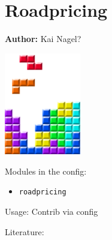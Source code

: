 \chapter{Roadpricing }
\label{ch:roadpricing}

\hfill \textbf{Author:} Kai Nagel?

\begin{center} \includegraphics[width=0.25\textwidth, angle=0]{figures/MATSimBook.png} \end{center}

Modules in the config: 
\begin{itemize}
	\item \lstinline|roadpricing|
\end{itemize}

Usage: Contrib via config

Literature: \citet[][]{RieserEtAl_TechRep_VSP_2007, Rieser_unpub_IVT_2008, GretherEtAl_ERSA_2008, RieserEtAl_TRBTDF_2008} 


